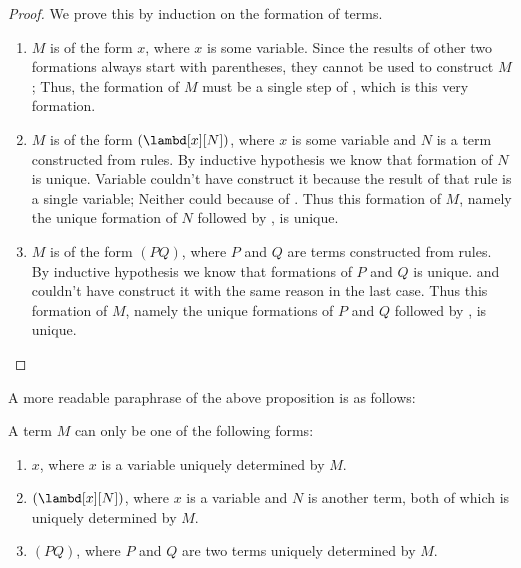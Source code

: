 \documentclass[../../../include/open-logic-section]{subfiles}
\begin{document}
\begin{proof}
  We prove this by induction on the formation of terms. 
  \begin{enumerate}
    \item $M$ is of the form
      $x$, where $x$ is some variable. Since the results of other two
      formations always start with parentheses, they cannot be used to
      construct $M$; Thus, the formation of $M$ must be a single step
      of , which is this very formation.
    \item $M$ is of the
      form $(\lambd[x][N])$, where $x$ is some variable and $N$ is a
      term constructed from rules. By inductive hypothesis we know that formation of
      $N$ is unique. Variable couldn't have construct it
      because the result of that rule is a single variable;
      Neither could  because of . Thus
      this formation of $M$, namely the unique formation of $N$
      followed by , is unique.

    \item  $M$ is of the form
      $(PQ)$, where $P$ and $Q$ are terms constructed from rules. By
      inductive hypothesis we know that formations of $P$ and $Q$ is unique.  and
       couldn't have construct it with the same reason in the 
      last case. Thus this formation of $M$, namely the unique
      formations of $P$ and $Q$ followed by , is unique.
  \end{enumerate}
\end{proof}

A more readable paraphrase of the above proposition is as follows:
\begin{prop}
  A term $M$ can only be one of the following forms:
  \begin{enumerate}
    \item $x$, where $x$ is a variable uniquely determined by $M$.
    \item $(\lambd[x][N])$, where $x$ is a variable and $N$ is
      another term, both of which is uniquely determined by $M$.
    \item $(PQ)$, where $P$ and $Q$ are two terms uniquely
      determined by $M$.
  \end{enumerate}
\end{prop}
\end{document}

